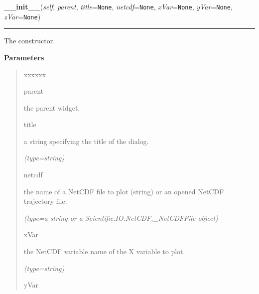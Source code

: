    \label{nMOLDYN:GUI:PlotNetCDFVariableDialog:PlotNetCDFVariableDialog:__init__}

    \vspace{0.5ex}

\hspace{.8\funcindent}\begin{boxedminipage}{\funcwidth}

    \raggedright \textbf{\_\_init\_\_}(\textit{self}, \textit{parent}, \textit{title}={\tt None}, \textit{netcdf}={\tt None}, \textit{xVar}={\tt None}, \textit{yVar}={\tt None}, \textit{zVar}={\tt None})

    \vspace{-1.5ex}

    \rule{\textwidth}{0.5\fboxrule}
\setlength{\parskip}{2ex}
    The constructor.

\setlength{\parskip}{1ex}
      \textbf{Parameters}
      \vspace{-1ex}

      \begin{quote}
        \begin{Ventry}{xxxxxx}

          \item[parent]

          the parent widget.

          \item[title]

          a string specifying the title of the dialog.

            {\it (type=string)}

          \item[netcdf]

          the name of a NetCDF file to plot (string) or an opened NetCDF 
          trajectory file.

            {\it (type=a string or a Scientific.IO.NetCDF.\_NetCDFFile object)}

          \item[xVar]

          the NetCDF variable name of the X variable to plot.

            {\it (type=string)}

          \item[yVar]


\end{Ventry}
\end{quote}
\end{boxedminipage}
